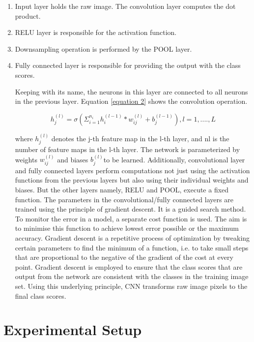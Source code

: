 \documentclass[conference]{IEEEtran}
\begin{document}
\begin{enumerate}

\item Input layer holds the raw image. The convolution layer computes the dot product.
\item RELU layer is responsible for the activation function.
\item Downsampling operation is performed by the POOL layer.
\item  Fully connected layer is responsible for providing the output with the class scores.

    Keeping with its name, the neurons in this layer are connected to all neurons in the previous layer. Equation \ref{equation 2} shows the convolution operation.


 

\begin{equation}
\label{equation 2}
h_j^{(l)} = \sigma(\Sigma_{i=1}^{n_i} h_i^{(l-1)} * w_{ij}^{(l)} + b_j^{(l-1)}) , l=1,....,L
\end{equation}

where $h^{(l)}_j$ denotes the j-th feature map in the l-th layer, and nl is the number of feature maps in the l-th layer. The network is parameterized by weights $w_{ij}^{(l)}$ and biases $b_j^{(l)}$to be learned\cite{lee2009convolutional}.  Additionally, convolutional layer and fully connected layers perform computations not just using the activation functions from the previous layers but also using their individual weights and biases. But the other layers namely, RELU and POOL, execute a  fixed function. The parameters in the convolutional/fully connected layers are trained using the principle of gradient descent. It is a guided search method. To monitor the error in a model, a separate cost function is used. The aim is to minimise this function to achieve lowest error possible or the maximum accuracy. Gradient descent is a repetitive process of optimization by tweaking certain parameters to find the minimum of a function, i.e. to take small steps that are proportional to the negative of the gradient of the cost at every point. Gradient descent is employed to ensure that the class scores that are output from the network are consistent with the classes in the training image set. Using this underlying principle, CNN transforms raw image pixels to the final class scores. 

\end{enumerate}

\section{Experimental Setup}
\label{sec:4 Experimental Setup} 
\end{document}
